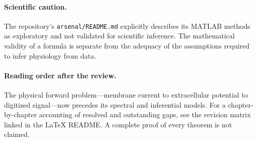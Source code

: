 \paragraph{Scientific caution.}
The repository's \texttt{arsenal/README.md} explicitly describes its
MATLAB methods as exploratory and not validated for scientific inference.
The mathematical validity of a formula is separate from the adequacy
of the assumptions required to infer physiology from data.

\paragraph{Reading order after the review.}
The physical forward problem---membrane current to extracellular potential
to digitized signal---now precedes its spectral and inferential models.
For a chapter-by-chapter accounting of resolved and outstanding gaps,
see the revision matrix linked in the LaTeX README.
A complete proof of every theorem is not claimed.
